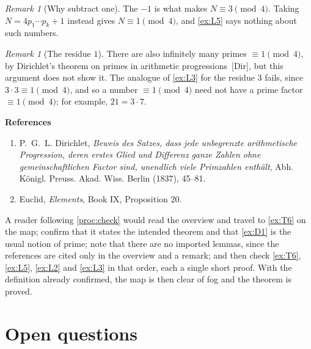 \documentclass[11pt]{article}
\theoremstyle{plain}
\theoremstyle{definition}
\theoremstyle{remark}
\newcounter{hffc}
\theoremstyle{definition}
\theoremstyle{plain}
\theoremstyle{remark}
\newtheorem{hffrem}[hffc]{Remark}
\begin{document}
\begin{tcolorbox}
\begin{hffrem}[Why subtract one]\label{ex:R7}
The $-1$ is what makes $N \equiv 3 \pmod 4$. Taking $N = 4p_1 \cdots p_k + 1$ instead gives $N \equiv 1 \pmod 4$, and \cref{ex:L5} says nothing about such numbers.
\end{hffrem}

\begin{hffrem}[The residue $1$]\label{ex:R8}
There are also infinitely many primes $\equiv 1 \pmod 4$, by Dirichlet's theorem on primes in arithmetic progressions~[Dir], but this argument does not show it. The analogue of \cref{ex:L3} for the residue $3$ fails, since $3 \cdot 3 \equiv 1 \pmod 4$, and so a number $\equiv 1 \pmod 4$ need not have a prime factor $\equiv 1 \pmod 4$; for example, $21 = 3 \cdot 7$.
\end{hffrem}

\medskip
\noindent\textbf{References}

\smallskip
{\small
\begin{enumerate}[leftmargin=3.2em, itemsep=2pt]
  \item[{[Dir]}] P.~G.~L. Dirichlet, \emph{Beweis des Satzes, dass jede unbegrenzte arithmetische Progression, deren erstes Glied und Differenz ganze Zahlen ohne gemeinschaftlichen Factor sind, unendlich viele Primzahlen enth\"alt}, Abh. K\"onigl. Preuss. Akad. Wiss. Berlin (1837), 45--81.
  \item[{[Euc]}] Euclid, \emph{Elements}, Book IX, Proposition 20.
\end{enumerate}
}
\end{tcolorbox}

A reader following \cref{proc:check} would read the overview and travel to \cref{ex:T6} on the map; confirm that it states the intended theorem and that \cref{ex:D1} is the usual notion of prime; note that there are no imported lemmas, since the references are cited only in the overview and a remark; and then check \cref{ex:T6}, \cref{ex:L5}, \cref{ex:L2} and \cref{ex:L3} in that order, each a single short proof. With the definition already confirmed, the map is then clear of fog and the theorem is proved.

\section{Open questions}\label{sec:open}
\end{document}
